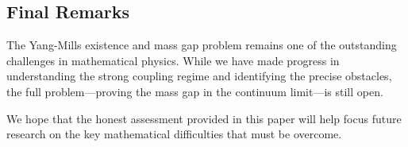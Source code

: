 \subsection{Final Remarks}

The Yang-Mills existence and mass gap problem remains one of the outstanding challenges in mathematical physics. While we have made progress in understanding the strong coupling regime and identifying the precise obstacles, the full problem---proving the mass gap in the continuum limit---is still open.

We hope that the honest assessment provided in this paper will help focus future research on the key mathematical difficulties that must be overcome.

\vspace{1cm}

\begin{center}
\end{center}


